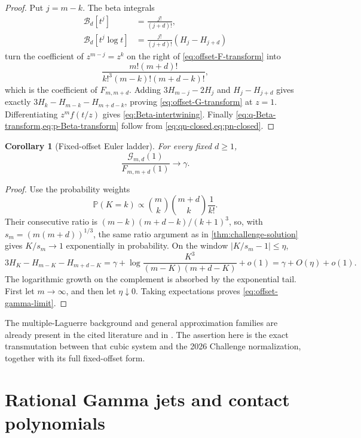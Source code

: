 \documentclass[11pt]{article}
\newtheorem{corollary}[theorem]{Corollary}
\theoremstyle{definition}
\theoremstyle{remark}
\newcommand{\Prob}{\mathbb P}
\begin{document}
\begin{proof}
Put \(j=m-k\).  The beta integrals
\begin{align*}
 \mathcal B_d[t^j]&=\frac{j!}{(j+d)!},\\
 \mathcal B_d[t^j\log t]&=\frac{j!}{(j+d)!}(H_j-H_{j+d})
\end{align*}
turn the coefficient of \(z^{m-j}=z^k\) on the right of
\eqref{eq:offset-F-transform} into
\[
 \frac{m!(m+d)!}{k!^3(m-k)!(m+d-k)!},
\]
which is the coefficient of \(F_{m,m+d}\).  Adding
\(3H_{m-j}-2H_j\) and \(H_j-H_{j+d}\) gives exactly
\(3H_k-H_{m-k}-H_{m+d-k}\), proving
\eqref{eq:offset-G-transform} at \(z=1\).  Differentiating
\(z^mf(t/z)\) gives
\eqref{eq:Beta-intertwining}.  Finally
\cref{eq:q-Beta-transform,eq:p-Beta-transform} follow from
\cref{eq:qn-closed,eq:pn-closed}.
\end{proof}

\begin{corollary}[Fixed-offset Euler ladder]
\label{cor:offset-ladder}
For every fixed \(d\ge1\),
\begin{equation}\label{eq:offset-gamma-limit}
 \boxed{\displaystyle
 \frac{\mathcal G_{m,d}(1)}{F_{m,m+d}(1)}\longrightarrow\gamma.}
\end{equation}
\end{corollary}

\begin{proof}
Use the probability weights
\[
 \Prob(K=k)\propto\binom mk\binom{m+d}k\frac1{k!}.
\]
Their consecutive ratio is
\((m-k)(m+d-k)/(k+1)^3\), so, with
\(s_m=(m(m+d))^{1/3}\), the same ratio argument as in
\cref{thm:challenge-solution} gives \(K/s_m\to1\) exponentially in
probability.  On the window \(|K/s_m-1|\le\eta\),
\[
 3H_K-H_{m-K}-H_{m+d-K}
 =\gamma+\log\frac{K^3}{(m-K)(m+d-K)}+o(1)
 =\gamma+O(\eta)+o(1).
\]
The logarithmic growth on the complement is absorbed by the exponential
tail.  First let \(m\to\infty\), and then let \(\eta\downarrow0\).
Taking expectations proves \eqref{eq:offset-gamma-limit}.
\end{proof}

The multiple-Laguerre background and general approximation families are
already present in the cited literature and in
\cite{WolfsVanAssche2025}.  The assertion here is the exact transmutation
between that cubic system and the 2026 Challenge normalization, together
with its full fixed-offset form.

\section{Rational Gamma jets and contact polynomials}
\label{sec:gamma-jets}
\end{document}
